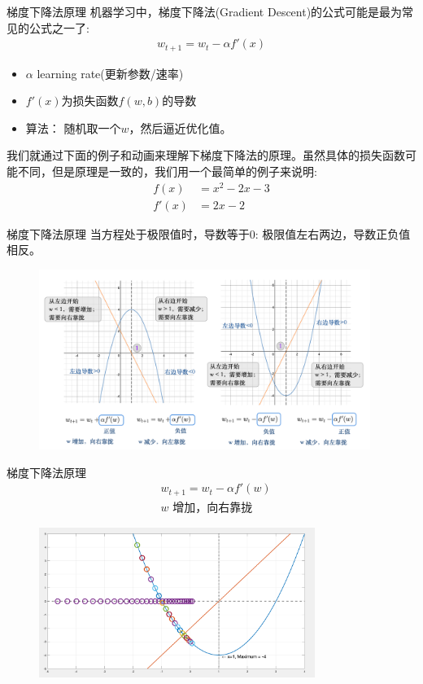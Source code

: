 \documentclass[handout]{ctexbeamer}
\begin{document}
\begin{frame}{梯度下降法原理}
	机器学习中，梯度下降法(Gradient Descent)的公式可能是最为常见的公式之一了:
	\begin{align*}
		w_{t+1} = w_t - \alpha f'(x) 
	\end{align*}
	\begin{itemize}
		\item $\alpha$ learning rate(更新参数/速率)
		\item $f'(x)$为损失函数$f(w, b)$的导数
		\item 算法： 随机取一个$w$，然后逼近优化值。
	\end{itemize}
	我们就通过下面的例子和动画来理解下梯度下降法的原理。虽然具体的损失函数可能不同，但是原理是一致的，我们用一个最简单的例子来说明:
	\begin{align*}
		f(x) & = x^2-2x-3 \\
		f'(x) & = 2x - 2
	\end{align*}
\end{frame}


\begin{frame}{梯度下降法原理}
当方程处于极限值时，导数等于0: 极限值左右两边，导数正负值相反。
\begin{figure}[H]
	\centering
	\includegraphics[width=0.96\textwidth]{fig/C2C2GradientDes}
\end{figure}		
\end{frame}

\begin{frame}{梯度下降法原理}
\begin{align*}
	& w_{t+1} = w_t - \alpha f'(w) \\
	& \text{$w$ 增加，向右靠拢}
\end{align*}	
\begin{figure}[H]
	\centering
	\includegraphics[width=0.8\textwidth]{fig/GDani1}
\end{figure}
\end{frame}
\end{document}
